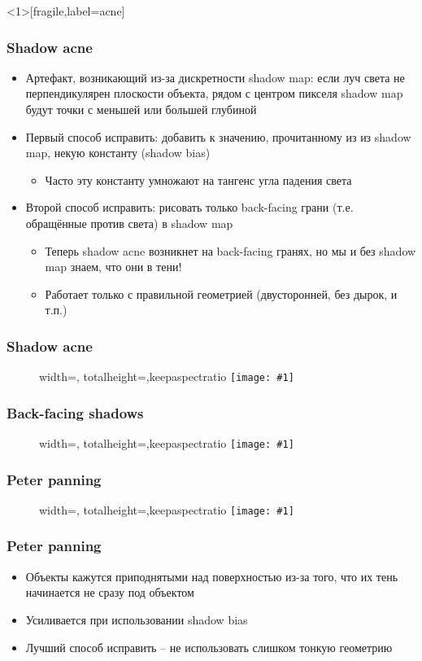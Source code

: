 \documentclass[10pt]{beamer}
\newcommand{\slideimage}[1]{
  \begin{figure}
    \begin{adjustbox}{width=\textwidth, totalheight=\textheight-2\baselineskip-2\baselineskip,keepaspectratio}
      \texttt{[image: \#1]}
    \end{adjustbox}
  \end{figure}
}
\begin{document}
\begin{frame}<1>[fragile,label=acne]
\frametitle{Shadow acne}
\begin{itemize}
\item Артефакт, возникающий из-за дискретности shadow map: если луч света не перпендикулярен плоскости объекта, рядом с центром пикселя shadow map будут точки с меньшей или большей глубиной
\pause
\item Первый способ исправить: добавить к значению, прочитанному из из shadow map, некую константу (shadow bias)
\begin{itemize}
\item Часто эту константу умножают на тангенс угла падения света
\end{itemize}
\pause
\item Второй способ исправить: рисовать только back-facing грани (т.е. обращённые против света) в shadow map
\begin{itemize}
\item Теперь shadow acne возникнет на back-facing гранях, но мы и без shadow map знаем, что они в тени!
\item Работает только с правильной геометрией (двусторонней, без дырок, и т.п.)
\end{itemize}
\end{itemize}
\end{frame}

\begin{frame}[fragile]
\frametitle{Shadow acne}
\slideimage{shadow-acne-scheme.png}
\end{frame}


\begin{frame}[fragile]
\frametitle{Back-facing shadows}
\slideimage{shadow-mapping-backface.png}
\end{frame}

\begin{frame}[fragile]
\frametitle{Peter panning}
\slideimage{peter-panning.png}
\end{frame}

\begin{frame}[fragile]
\frametitle{Peter panning}
\begin{itemize}
\item Объекты кажутся приподнятыми над поверхностью из-за того, что их тень начинается не сразу под объектом
\pause
\item Усиливается при использовании shadow bias
\pause
\item Лучший способ исправить -- не использовать слишком тонкую геометрию
\end{itemize}
\end{frame}
\end{document}
